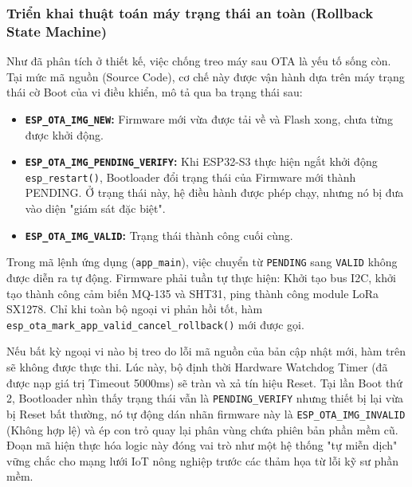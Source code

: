\subsubsection{Triển khai thuật toán máy trạng thái an toàn (Rollback State Machine)}
Như đã phân tích ở thiết kế, việc chống treo máy sau OTA là yếu tố sống còn. Tại mức mã nguồn (Source Code), cơ chế này được vận hành dựa trên máy trạng thái cờ Boot của vi điều khiển, mô tả qua ba trạng thái sau:

\begin{itemize}
    \item \textbf{\texttt{ESP\_OTA\_IMG\_NEW}:} Firmware mới vừa được tải về và Flash xong, chưa từng được khởi động.
    \item \textbf{\texttt{ESP\_OTA\_IMG\_PENDING\_VERIFY}:} Khi ESP32-S3 thực hiện ngắt khởi động \texttt{esp\_restart()}, Bootloader đổi trạng thái của Firmware mới thành PENDING. Ở trạng thái này, hệ điều hành được phép chạy, nhưng nó bị đưa vào diện "giám sát đặc biệt".
    \item \textbf{\texttt{ESP\_OTA\_IMG\_VALID}:} Trạng thái thành công cuối cùng.
\end{itemize}

Trong mã lệnh ứng dụng (\texttt{app\_main}), việc chuyển từ \texttt{PENDING} sang \texttt{VALID} không được diễn ra tự động. Firmware phải tuần tự thực hiện: Khởi tạo bus I2C, khởi tạo thành công cảm biến MQ-135 và SHT31, ping thành công module LoRa SX1278. Chỉ khi toàn bộ ngoại vi phản hồi tốt, hàm \texttt{esp\_ota\_mark\_app\_valid\_cancel\_rollback()} mới được gọi. 

Nếu bất kỳ ngoại vi nào bị treo do lỗi mã nguồn của bản cập nhật mới, hàm trên sẽ không được thực thi. Lúc này, bộ định thời Hardware Watchdog Timer (đã được nạp giá trị Timeout 5000ms) sẽ tràn và xả tín hiệu Reset. Tại lần Boot thứ 2, Bootloader nhìn thấy trạng thái vẫn là \texttt{PENDING\_VERIFY} nhưng thiết bị lại vừa bị Reset bất thường, nó tự động dán nhãn firmware này là \texttt{ESP\_OTA\_IMG\_INVALID} (Không hợp lệ) và ép con trỏ quay lại phân vùng chứa phiên bản phần mềm cũ. Đoạn mã hiện thực hóa logic này đóng vai trò như một hệ thống "tự miễn dịch" vững chắc cho mạng lưới IoT nông nghiệp trước các thảm họa từ lỗi kỹ sư phần mềm.

